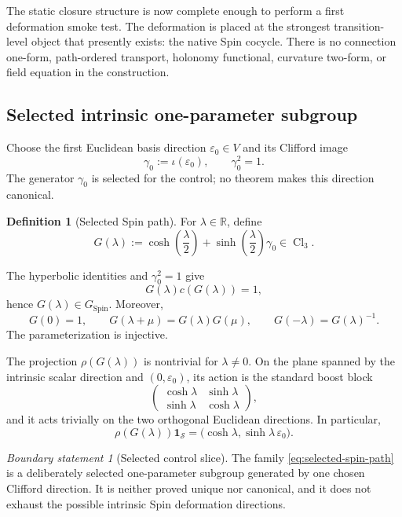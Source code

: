 \documentclass[11pt,a4paper]{article}
\theoremstyle{definition}
\newtheorem{definition}[theorem]{Definition}
\theoremstyle{remark}
\newtheorem{boundary}[theorem]{Boundary statement}
\newcommand{\R}{\mathbb{R}}
\newcommand{\Smodel}{\mathcal{S}}
\newcommand{\Cl}{\operatorname{Cl}}
\newcommand{\SpinG}{G_{\mathrm{Spin}}}
\begin{document}
The static closure structure is now complete enough to perform a first
deformation smoke test.  The deformation is placed at the strongest
transition-level object that presently exists: the native Spin cocycle.
There is no connection one-form, path-ordered transport, holonomy
functional, curvature two-form, or field equation in the construction.

\subsection{Selected intrinsic one-parameter subgroup}

Choose the first Euclidean basis direction \(\varepsilon_{0}\in V\)
and its Clifford image
\[
    \gamma_{0}:=\iota(\varepsilon_{0}),
    \qquad \gamma_{0}^{2}=1.
\]
The generator \(\gamma_{0}\) is selected for the control; no theorem makes
this direction canonical.

\begin{definition}[Selected Spin path]
\label{def:G-lambda}
For \(\lambda\in\R\), define
\[
   G(\lambda)
   :=
   \cosh\!\left(\frac{\lambda}{2}\right)
   +
   \sinh\!\left(\frac{\lambda}{2}\right)\gamma_{0}
   \in\Cl_{3}.
\tag{11.1}\label{eq:selected-spin-path}
\]
\end{definition}

The hyperbolic identities and \(\gamma_{0}^{2}=1\) give
\[
   G(\lambda)c(G(\lambda))=1,
\]
hence \(G(\lambda)\in\SpinG\).  Moreover,
\[
   G(0)=1,\qquad
   G(\lambda+\mu)=G(\lambda)G(\mu),\qquad
   G(-\lambda)=G(\lambda)^{-1}.
\tag{11.2}
\]
The parameterization is injective.

The projection \(\rho(G(\lambda))\) is nontrivial for
\(\lambda\neq0\).  On the plane spanned by the intrinsic scalar direction
and \((0,\varepsilon_{0})\), its action is the standard boost block
\[
   \begin{pmatrix}
      \cosh\lambda & \sinh\lambda\\
      \sinh\lambda & \cosh\lambda
   \end{pmatrix},
\tag{11.3}\label{eq:boost-block}
\]
and it acts trivially on the two orthogonal Euclidean directions.
In particular,
\[
   \rho(G(\lambda))\mathbf1_{\Smodel}
   =
   \bigl(\cosh\lambda,\sinh\lambda\,\varepsilon_{0}\bigr).
\tag{11.4}
\]

\begin{boundary}[Selected control slice]
\label{bdry:selected}
The family \eqref{eq:selected-spin-path} is a deliberately selected one-parameter subgroup
generated by one chosen Clifford direction.  It is neither proved unique
nor canonical, and it does not exhaust the possible intrinsic Spin
deformation directions.
\end{boundary}
\end{document}
